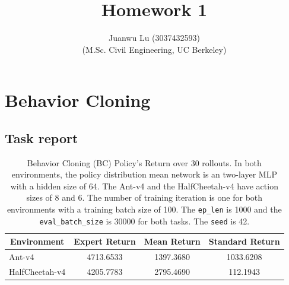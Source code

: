 \documentclass[10pt, letterpaper]{article}
\title{%
    \textbf{Homework 1}
}
\author{Juanwu Lu (3037432593)\\ \small(M.Sc. Civil Engineering, UC Berkeley)}
\date{}
\begin{document}
    \maketitle
    \thispagestyle{fancy}

    \section{Behavior Cloning}
    \subsection{Task report}
    \begin{table}[htbp]
        \centering
        \caption{Behavior Cloning (BC) Policy's Return over 30 rollouts. In both environments, the policy distribution mean network is an two-layer MLP with a hidden size of 64. The Ant-v4 and the HalfCheetah-v4 have action sizes of 8 and 6. The number of training iteration is one for both environments with a training batch size of 100. The \texttt{ep\_len} is 1000 and the \texttt{eval\_batch\_size} is 30000 for both tasks. The \texttt{seed} is 42.}
        \begin{tabular}{@{}lccc@{}}
            \toprule
            \multicolumn{1}{c}{\textbf{Environment}} & \multicolumn{1}{l}{\textbf{Expert Return}} & \textbf{Mean Return} & \textbf{Standard Return} \\ \midrule
            Ant-v4                                   & 4713.6533                                  & 1397.3680            & 1033.6208                \\
            HalfCheetah-v4                           & 4205.7783                                  & 2795.4690            & 112.1943                 \\ \bottomrule
            \end{tabular}
        \label{tab:1}
    \end{table}
\end{document}
